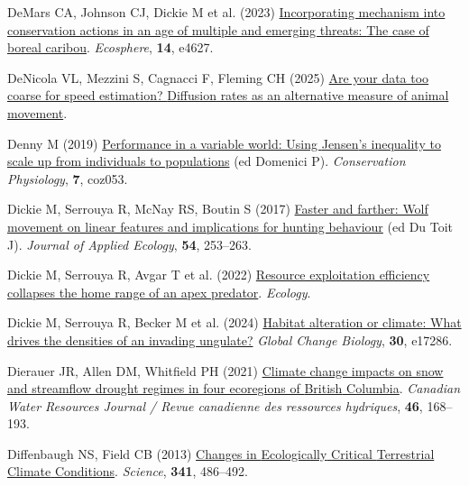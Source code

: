 \documentclass[
  12pt,
]{article}
\newlength{\cslhangindent}
\newenvironment{CSLReferences}[2] %
 {\begin{list}{}{%
  \setlength{\itemindent}{0pt}
  \setlength{\leftmargin}{0pt}
  \setlength{\parsep}{0pt}
  \ifodd #1
   \setlength{\leftmargin}{\cslhangindent}
   \setlength{\itemindent}{-1\cslhangindent}
  \fi
  \setlength{\itemsep}{#2\baselineskip}}}
 {\end{list}}
\begin{document}
\begin{CSLReferences}{1}{0}
DeMars CA, Johnson CJ, Dickie M et al. (2023) \href{https://doi.org/10.1002/ecs2.4627}{Incorporating mechanism into conservation actions in an age of multiple and emerging threats: {The} case of boreal caribou}. \emph{Ecosphere}, \textbf{14}, e4627.

DeNicola VL, Mezzini S, Cagnacci F, Fleming CH (2025) \href{https://doi.org/10.1101/2025.07.17.665364}{Are your data too coarse for speed estimation? {Diffusion} rates as an alternative measure of animal movement}.

Denny M (2019) \href{https://doi.org/10.1093/conphys/coz053}{Performance in a variable world: Using {Jensen}'s inequality to scale up from individuals to populations} (ed Domenici P). \emph{Conservation Physiology}, \textbf{7}, coz053.

Dickie M, Serrouya R, McNay RS, Boutin S (2017) \href{https://doi.org/10.1111/1365-2664.12732}{Faster and farther: Wolf movement on linear features and implications for hunting behaviour} (ed Du Toit J). \emph{Journal of Applied Ecology}, \textbf{54}, 253--263.

Dickie M, Serrouya R, Avgar T et al. (2022) \href{https://doi.org/10.1002/ecy.3642}{Resource exploitation efficiency collapses the home range of an apex predator}. \emph{Ecology}.

Dickie M, Serrouya R, Becker M et al. (2024) \href{https://doi.org/10.1111/gcb.17286}{Habitat alteration or climate: {What} drives the densities of an invading ungulate?} \emph{Global Change Biology}, \textbf{30}, e17286.

Dierauer JR, Allen DM, Whitfield PH (2021) \href{https://doi.org/10.1080/07011784.2021.1960894}{Climate change impacts on snow and streamflow drought regimes in four ecoregions of {British} {Columbia}}. \emph{Canadian Water Resources Journal / Revue canadienne des ressources hydriques}, \textbf{46}, 168--193.

Diffenbaugh NS, Field CB (2013) \href{https://doi.org/10.1126/science.1237123}{Changes in {Ecologically} {Critical} {Terrestrial} {Climate} {Conditions}}. \emph{Science}, \textbf{341}, 486--492.


\end{CSLReferences}
\end{document}
